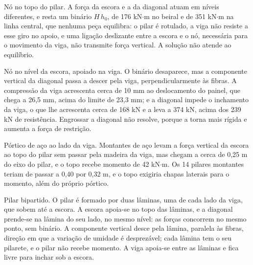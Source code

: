 \begin{alineas}
    \item Nó no topo do pilar. A força da escora e a da diagonal atuam em níveis
          diferentes, e resta um binário $H\,h_0$, de 176 kN$\cdot$m no beiral e de
          351 kN$\cdot$m na linha central, que nenhuma peça equilibra: o pilar é
          rotulado, a viga não resiste a esse giro no apoio, e uma ligação
          deslizante entre a escora e o nó, necessária para o movimento da viga, não
          transmite força vertical. A solução não atende ao equilíbrio.
    \item Nó no nível da escora, apoiado na viga. O binário desaparece, mas a
          componente vertical da diagonal passa a descer pela viga,
          perpendicularmente às fibras. A compressão da viga acrescenta cerca de
          10 mm ao deslocamento do painel, que chega a 26,5 mm, acima do limite de
          23,3 mm; e a diagonal impede o inchamento da viga, o que lhe acrescenta
          cerca de 168 kN e a leva a 374 kN, acima dos 239 kN de resistência.
          Engrossar a diagonal não resolve, porque a torna mais rígida e aumenta a
          força de restrição.
    \item Pórtico de aço ao lado da viga. Montantes de aço levam a força vertical
          da escora ao topo do pilar sem passar pela madeira da viga, mas chegam a
          cerca de 0,25 m do eixo do pilar, e o topo recebe momento de 42
          kN$\cdot$m. Os 14 pilares montantes teriam de passar a 0,40 por 0,32 m, e
          o topo exigiria chapas laterais para o momento, além do próprio pórtico.
    \item Pilar bipartido. O pilar é formado por duas lâminas, uma de cada lado da
          viga, que sobem até a escora. A escora apoia-se no topo das lâminas, e a
          diagonal prende-se na lâmina do seu lado, no mesmo nível: as forças
          concorrem no mesmo ponto, sem binário. A componente vertical desce pela
          lâmina, paralela às fibras, direção em que a variação de umidade é
          desprezável; cada lâmina tem o seu pilarete, e o pilar não recebe momento.
          A viga apoia-se entre as lâminas e fica livre para inchar sob a escora.
\end{alineas}

